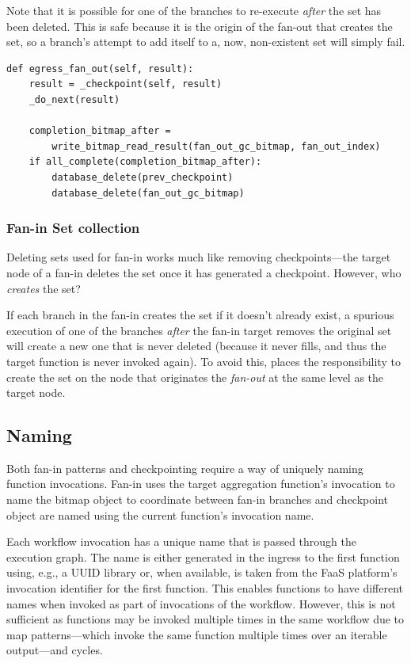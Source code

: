 Note that it is possible for one of the branches to re-execute \emph{after} the
set has been deleted. This is safe because it is the origin of the fan-out that
creates the set, so a branch's attempt to add itself to a, now, non-existent set
will simply fail.

\begin{verbatim}
def egress_fan_out(self, result):
    result = _checkpoint(self, result)
    _do_next(result)

    completion_bitmap_after =
        write_bitmap_read_result(fan_out_gc_bitmap, fan_out_index)
    if all_complete(completion_bitmap_after):
        database_delete(prev_checkpoint)
        database_delete(fan_out_gc_bitmap)
\end{verbatim}

\subsubsection{Fan-in Set collection}

Deleting sets used for fan-in works much like removing checkpoints---the target
node of a fan-in deletes the set once it has generated a checkpoint. However,
who \emph{creates} the set?

If each branch in the fan-in creates the set if it doesn't already exist, a
spurious execution of one of the branches \emph{after} the fan-in target removes
the original set will create a new one that is never deleted (because it never
fills, and thus the target function is never invoked again). To avoid this,
\name{} places the responsibility to create the set on the node that originates
the \emph{fan-out} at the same level as the target node.

\subsection{Naming}\label{sec:design:naming}

Both fan-in patterns and checkpointing require a way of uniquely naming function
invocations. Fan-in uses the target aggregation function's invocation to name
the bitmap object to coordinate between fan-in branches and checkpoint object
are named using the current function's invocation name.

Each workflow invocation has a unique name that is passed through the execution
graph. The name is either generated in the ingress to the first function using,
e.g., a UUID library or, when available, is taken from the FaaS platform's
invocation identifier for the first function. This enables functions to have
different names when invoked as part of invocations of the workflow. However,
this is not sufficient as functions may be invoked multiple times in the same
workflow due to map patterns---which invoke the same function multiple times over
an iterable output---and cycles.

